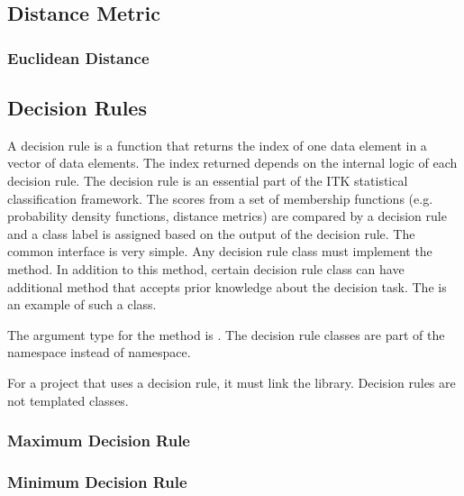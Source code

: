 

\subsection{Distance Metric}
\label{sec:DistanceMetric}

\subsubsection{Euclidean Distance}
\label{sec:EuclideanDistance}



\subsection{Decision Rules}
\label{sec:DecisionRules}

A decision rule is a function that returns the index of one data element in a
vector of data elements. The index returned depends on the internal logic of
each decision rule. The decision rule is an essential part of the ITK
statistical classification framework. The scores from a set of membership
functions (e.g. probability density functions, distance metrics) are compared
by a decision rule and a class label is assigned based on the output of the
decision rule. The common interface is very simple. Any decision rule class
must implement the  method. In addition to this method,
certain decision rule class can have additional method that accepts prior
knowledge about the decision task. The
 is an example of such a class.

The argument type for the  method is
. The decision rule classes are part of the
 namespace instead of  namespace.

For a project that uses a decision rule, it must link the 
library. Decision rules are not templated classes.

\subsubsection{Maximum Decision Rule}
\label{sec:MaximumDecisionRule}



\subsubsection{Minimum Decision Rule}
\label{sec:MinimumDecisionRule}

